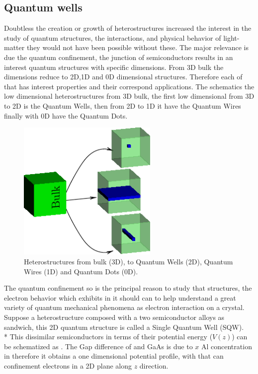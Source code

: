 \subsection{Quantum wells}
\vspace{-10mm} 
Doubtless the creation or growth of heterostructures increased the interest in the study of quantum structures, the interactions, and physical behavior of light-matter they would not have been possible without these.  The major relevance is due the quantum confinement, the junction of semiconductors results in an interest quantum structures with specific dimensions. From 3D bulk the dimensions reduce to 2D,1D and 0D dimensional structures. Therefore each of that has interest properties and their correspond applications. The  schematics the low dimensional heterostructures from 3D bulk, the first low dimensional from 3D to 2D  is the Quantum Wells, then from 2D to 1D it have the Quantum Wires finally with 0D have the Quantum Dots.
\begin{figure}
	\centering
	\includegraphics[width=0.6\textwidth]{../figures/chapter-1/heterostructures/out-ruco/lds-00}
	\caption{Heterostructures from bulk (3D), to Quantum Wells (2D), Quantum Wires (1D) and Quantum Dots (0D).  }
	\label{fig:subsection-1.2-heterostructures}
\end{figure}
The quantum confinement so is the principal reason to study that structures, the electron behavior which exhibits in it  should  can to help  understand  a great variety of quantum mechanical phenomena as electron interaction on a crystal. 
Suppose a heterostructure composed with a two semiconductor alloys as sandwich, this 2D quantum structure is called a Single Quantum Well (SQW). \\*
This dissimilar semiconductors in terms of their potential energy ($V(z)$) can be schematized as . The Gap difference of \algaas and GaAs is due to $x$ Al concentration in \algaas therefore it obtains a one dimensional potential profile, with that can confinement electrons in a 2D plane along $z$ direction. 
